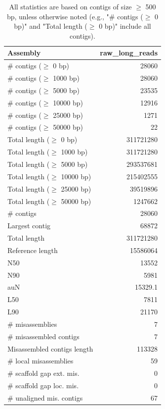 \documentclass[12pt,a4paper]{article}
\begin{document}
\begin{table}[ht]
\begin{center}
\caption{All statistics are based on contigs of size $\geq$ 500 bp, unless otherwise noted (e.g., "\# contigs ($\geq$ 0 bp)" and "Total length ($\geq$ 0 bp)" include all contigs).}
\begin{tabular}{|l*{1}{|r}|}
\hline
Assembly & raw\_long\_reads \\ \hline
\# contigs ($\geq$ 0 bp) & 28060 \\ \hline
\# contigs ($\geq$ 1000 bp) & 28060 \\ \hline
\# contigs ($\geq$ 5000 bp) & 23535 \\ \hline
\# contigs ($\geq$ 10000 bp) & 12916 \\ \hline
\# contigs ($\geq$ 25000 bp) & 1271 \\ \hline
\# contigs ($\geq$ 50000 bp) & 22 \\ \hline
Total length ($\geq$ 0 bp) & 311721280 \\ \hline
Total length ($\geq$ 1000 bp) & 311721280 \\ \hline
Total length ($\geq$ 5000 bp) & 293537681 \\ \hline
Total length ($\geq$ 10000 bp) & 215402555 \\ \hline
Total length ($\geq$ 25000 bp) & 39519896 \\ \hline
Total length ($\geq$ 50000 bp) & 1247662 \\ \hline
\# contigs & 28060 \\ \hline
Largest contig & 68872 \\ \hline
Total length & 311721280 \\ \hline
Reference length & 15586064 \\ \hline
N50 & 13552 \\ \hline
N90 & 5981 \\ \hline
auN & 15329.1 \\ \hline
L50 & 7811 \\ \hline
L90 & 21170 \\ \hline
\# misassemblies & 7 \\ \hline
\# misassembled contigs & 7 \\ \hline
Misassembled contigs length & 113328 \\ \hline
\# local misassemblies & 59 \\ \hline
\# scaffold gap ext. mis. & 0 \\ \hline
\# scaffold gap loc. mis. & 0 \\ \hline
\# unaligned mis. contigs & 67 \\ \hline

\end{tabular}
\end{center}
\end{table}
\end{document}
